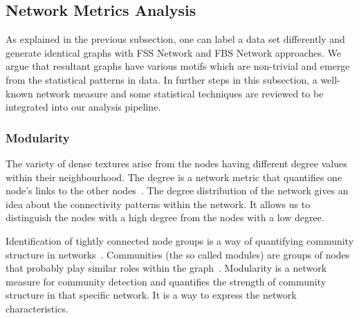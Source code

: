 \subsection*{Network Metrics Analysis}
%
As explained in the previous subsection, one can label a data set differently and generate identical graphs with FSS Network and FBS Network approaches. We argue that resultant graphs have various motifs which are non-trivial and emerge from the statistical patterns in data. In further steps in this subsection, a well-known network measure and some statistical techniques are reviewed to be integrated into our analysis pipeline.
\subsubsection*{Modularity}
The variety of dense textures arise from the nodes having different degree values within their neighbourhood. The degree is a network metric that quantifies one node's links to the other nodes~\cite{Barabasi2016}. The degree distribution of the network gives an idea about the connectivity patterns within the network. It allows us to distinguish the nodes with a high degree from the nodes with a low degree.

Identification of tightly connected node groups is a way of quantifying community structure in networks~\cite{Girvan7821}. Communities (the so called modules) are groups of nodes that probably play similar roles within the graph~\cite{FORTUNATO201075}. Modularity is a network measure for community detection and quantifies the strength of community structure in that specific network. It is a way to express the network characteristics. 

